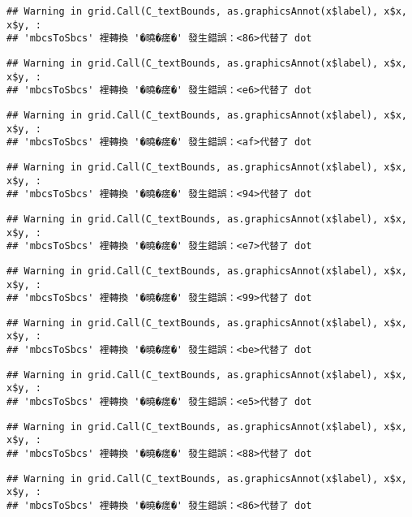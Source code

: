\documentclass[
]{article}
\begin{document}
\begin{verbatim}
## Warning in grid.Call(C_textBounds, as.graphicsAnnot(x$label), x$x, x$y, :
## 'mbcsToSbcs' 裡轉換 '�曉�瘥�' 發生錯誤：<86>代替了 dot
\end{verbatim}

\begin{verbatim}
## Warning in grid.Call(C_textBounds, as.graphicsAnnot(x$label), x$x, x$y, :
## 'mbcsToSbcs' 裡轉換 '�曉�瘥�' 發生錯誤：<e6>代替了 dot
\end{verbatim}

\begin{verbatim}
## Warning in grid.Call(C_textBounds, as.graphicsAnnot(x$label), x$x, x$y, :
## 'mbcsToSbcs' 裡轉換 '�曉�瘥�' 發生錯誤：<af>代替了 dot
\end{verbatim}

\begin{verbatim}
## Warning in grid.Call(C_textBounds, as.graphicsAnnot(x$label), x$x, x$y, :
## 'mbcsToSbcs' 裡轉換 '�曉�瘥�' 發生錯誤：<94>代替了 dot
\end{verbatim}

\begin{verbatim}
## Warning in grid.Call(C_textBounds, as.graphicsAnnot(x$label), x$x, x$y, :
## 'mbcsToSbcs' 裡轉換 '�曉�瘥�' 發生錯誤：<e7>代替了 dot
\end{verbatim}

\begin{verbatim}
## Warning in grid.Call(C_textBounds, as.graphicsAnnot(x$label), x$x, x$y, :
## 'mbcsToSbcs' 裡轉換 '�曉�瘥�' 發生錯誤：<99>代替了 dot
\end{verbatim}

\begin{verbatim}
## Warning in grid.Call(C_textBounds, as.graphicsAnnot(x$label), x$x, x$y, :
## 'mbcsToSbcs' 裡轉換 '�曉�瘥�' 發生錯誤：<be>代替了 dot
\end{verbatim}

\begin{verbatim}
## Warning in grid.Call(C_textBounds, as.graphicsAnnot(x$label), x$x, x$y, :
## 'mbcsToSbcs' 裡轉換 '�曉�瘥�' 發生錯誤：<e5>代替了 dot
\end{verbatim}

\begin{verbatim}
## Warning in grid.Call(C_textBounds, as.graphicsAnnot(x$label), x$x, x$y, :
## 'mbcsToSbcs' 裡轉換 '�曉�瘥�' 發生錯誤：<88>代替了 dot
\end{verbatim}

\begin{verbatim}
## Warning in grid.Call(C_textBounds, as.graphicsAnnot(x$label), x$x, x$y, :
## 'mbcsToSbcs' 裡轉換 '�曉�瘥�' 發生錯誤：<86>代替了 dot
\end{verbatim}
\end{document}
